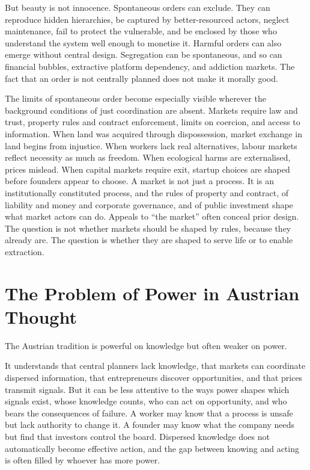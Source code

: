 \documentclass[11pt,a4paper,oneside]{book}
\begin{document}
But beauty is not innocence. Spontaneous orders can exclude. They can reproduce hidden hierarchies, be captured by better-resourced actors, neglect maintenance, fail to protect the vulnerable, and be enclosed by those who understand the system well enough to monetise it. Harmful orders can also emerge without central design. Segregation can be spontaneous, and so can financial bubbles, extractive platform dependency, and addiction markets. The fact that an order is not centrally planned does not make it morally good.

The limits of spontaneous order become especially visible wherever the background conditions of just coordination are absent. Markets require law and trust, property rules and contract enforcement, limits on coercion, and access to information. When land was acquired through dispossession, market exchange in land begins from injustice. When workers lack real alternatives, labour markets reflect necessity as much as freedom. When ecological harms are externalised, prices mislead. When capital markets require exit, startup choices are shaped before founders appear to choose. A market is not just a process. It is an institutionally constituted process, and the rules of property and contract, of liability and money and corporate governance, and of public investment shape what market actors can do. Appeals to ``the market'' often conceal prior design. The question is not whether markets should be shaped by rules, because they already are. The question is whether they are shaped to serve life or to enable extraction.

\section*{The Problem of Power in Austrian Thought}

The Austrian tradition is powerful on knowledge but often weaker on power.

It understands that central planners lack knowledge, that markets can coordinate dispersed information, that entrepreneurs discover opportunities, and that prices transmit signals. But it can be less attentive to the ways power shapes which signals exist, whose knowledge counts, who can act on opportunity, and who bears the consequences of failure. A worker may know that a process is unsafe but lack authority to change it. A founder may know what the company needs but find that investors control the board. Dispersed knowledge does not automatically become effective action, and the gap between knowing and acting is often filled by whoever has more power.
\end{document}

